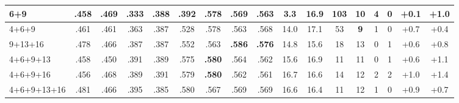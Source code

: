 \begin{table}[ht]
\begin{center}
\begin{tabular}{l cc cc cc cc cc cc cc cc}
6+9         & .458 & .469          & .333 & .388          & .392          & .578          & .569          & .563          & \textbf{3.3}  & 16.9          & 103         & 10          & 4 & 0 & +0.1 & +1.0 \\
\midrule
4+6+9       & .461 & .461          & .363 & .387          & .528          & .578          & .563          & .568          & 14.0          & 17.1          & 53          & \textbf{9}  & 1 & 0 & +0.7 & +0.4 \\
9+13+16     & .478 & .466          & .387 & .387          & .552          & .563          & \textbf{.586} & \textbf{.576} & 14.8          & 15.6          & 18          & 13          & 0 & 1 & +0.6 & +0.8 \\
4+6+9+13    & .458 & .450          & .391 & .389          & .575          & \textbf{.580} & .564          & .562          & 15.6          & 16.9          & 11          & 11          & 0 & 1 & +0.6 & +1.1 \\
4+6+9+16    & .456 & .468          & .389 & .391          & .579          & \textbf{.580} & .562          & .561          & 16.7          & 16.6          & 14          & 12          & 2 & 2 & +1.0 & +1.4 \\
\midrule
4+6+9+13+16 & .481 & .466          & .395 & .385          & .580          & .567          & .569          & .569          & 16.6          & 16.4          & 11          & 12          & 1 & 0 & +0.9 & +0.7 \\
\bottomrule
\end{tabular}
\end{center}
\end{table}
